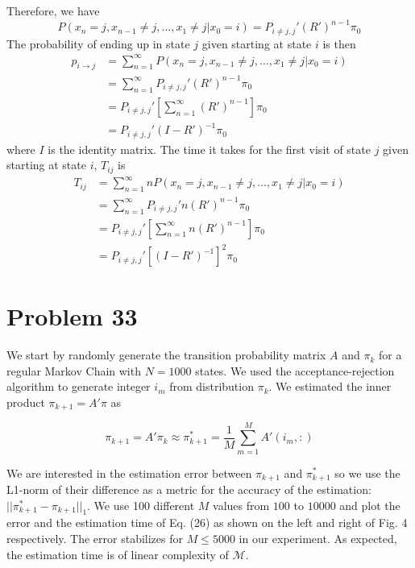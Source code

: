 \documentclass[a4paper, 11pt]{article}
\begin{document}
Therefore, we have 
\begin{equation}
P(x_n = j, x_{n-1} \neq j, \dots, x_1 \neq j | x_0 = i) = P_{i\neq j, j}' (R')^{n-1} \pi_0
\end{equation}
The probability of ending up in state $j$ given starting at state $i$ is then 
\begin{equation}
\begin{split}
p_{i\to j} & = \sum_{n=1}^{\infty} P(x_n = j, x_{n-1} \neq j, \dots, x_1 \neq j | x_0 = i)\\
 & = \sum_{n=1}^{\infty} P_{i\neq j, j}' (R')^{n-1} \pi_0 \\
 & = P_{i\neq j, j}' \left[ \sum_{n=1}^{\infty} (R')^{n-1} \right]\pi_0 \\
 & = P_{i\neq j, j}' (I - R')^{-1} \pi_0
\end{split}
\end{equation}
where $I$ is the identity matrix. The time it takes for the first visit of state $j$ given starting at state $i$, $T_{ij}$ is
\begin{equation}
\begin{split}
T_{ij} & = \sum_{n=1}^{\infty} n P(x_n = j, x_{n-1} \neq j, \dots, x_1 \neq j | x_0 = i)\\
 & = \sum_{n=1}^{\infty} P_{i\neq j, j}' n(R')^{n-1} \pi_0 \\
 & = P_{i\neq j, j}' \left[ \sum_{n=1}^{\infty} n(R')^{n-1} \right] \pi_0 \\
 & = P_{i\neq j, j}' \left[ (I - R')^{-1} \right]^2 \pi_0
\end{split}
\end{equation}


\section*{Problem 33}


We start by randomly generate the transition probability matrix $A$ and $\pi_k$ for a regular Markov Chain with $N=1000$ states. We used the acceptance-rejection algorithm to generate integer $i_m$ from distribution $\pi_k$. We estimated the inner product $\pi_{k+1} = A'\pi$ as 

\begin{equation}
\pi_{k+1} = A'\pi_k \approx \pi^*_{k+1} = \frac{1}{M}\sum_{m=1}^M A'(i_m, :)
\end{equation} 

We are interested in the estimation error between $\pi_{k+1}$ and $\pi^*_{k+1}$ so we use the L1-norm of their difference as a metric for the accuracy of the estimation: $||\pi^*_{k+1} - \pi_{k+1}||_1$. We use 100 different $M$ values from $100$ to $10000$ and plot the error and the estimation time of Eq. (26) as shown on the left and right of Fig. 4 respectively. The error stabilizes for $M \leq 5000$ in our experiment. As expected, the estimation time is of linear complexity of $\mathcal{M}$. 
\end{document}
